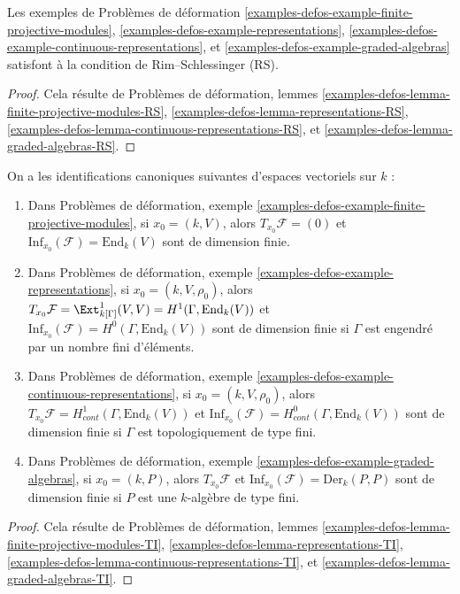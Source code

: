 \begin{lemma}
\label{lemma-examples-have-RS}
Les exemples de Problèmes de déformation
\ref{examples-defos-example-finite-projective-modules},
\ref{examples-defos-example-representations},
\ref{examples-defos-example-continuous-representations}, et
\ref{examples-defos-example-graded-algebras}
satisfont à la condition de Rim--Schlessinger (RS).
\end{lemma}

\begin{proof}
Cela résulte de Problèmes de déformation, lemmes
\ref{examples-defos-lemma-finite-projective-modules-RS},
\ref{examples-defos-lemma-representations-RS},
\ref{examples-defos-lemma-continuous-representations-RS}, et
\ref{examples-defos-lemma-graded-algebras-RS}.
\end{proof}

\begin{lemma}
\label{lemma-tangent-and-inf}
On a les identifications canoniques suivantes d'espaces vectoriels sur $k$ :
\begin{enumerate}
\item Dans Problèmes de déformation, exemple
\ref{examples-defos-example-finite-projective-modules},
si $x_0 = (k, V)$, alors $T_{x_0}\mathcal{F} = (0)$
et $\text{Inf}_{x_0}(\mathcal{F}) = \text{End}_k(V)$
sont de dimension finie.
\item Dans Problèmes de déformation, exemple
\ref{examples-defos-example-representations},
si $x_0 = (k, V, \rho_0)$, alors
$T_{x_0}\mathcal{F} = \Ext^1_{k[\Gamma]}(V, V) = H^1(\Gamma, \text{End}_k(V))$
et $\text{Inf}_{x_0}(\mathcal{F}) = H^0(\Gamma, \text{End}_k(V))$
sont de dimension finie si $\Gamma$ est engendré par un nombre fini d'éléments.
\item Dans Problèmes de déformation, exemple
\ref{examples-defos-example-continuous-representations},
si $x_0 = (k, V, \rho_0)$, alors
$T_{x_0}\mathcal{F} = H^1_{cont}(\Gamma, \text{End}_k(V))$
et
$\text{Inf}_{x_0}(\mathcal{F}) = H^0_{cont}(\Gamma, \text{End}_k(V))$
sont de dimension finie si $\Gamma$ est topologiquement de type fini.
\item Dans Problèmes de déformation, exemple
\ref{examples-defos-example-graded-algebras},
si $x_0 = (k, P)$, alors
$T_{x_0}\mathcal{F}$ et $\text{Inf}_{x_0}(\mathcal{F}) = \text{Der}_k(P, P)$
sont de dimension finie si $P$ est une $k$-algèbre de type fini.
\end{enumerate}
\end{lemma}

\begin{proof}
Cela résulte de Problèmes de déformation, lemmes
\ref{examples-defos-lemma-finite-projective-modules-TI},
\ref{examples-defos-lemma-representations-TI},
\ref{examples-defos-lemma-continuous-representations-TI}, et
\ref{examples-defos-lemma-graded-algebras-TI}.
\end{proof}













